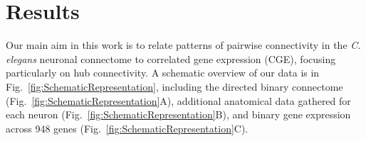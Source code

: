 \documentclass[10pt,letterpaper]{article}
\begin{document}




\section*{Results}
Our main aim in this work is to relate patterns of pairwise connectivity in the \emph{C. elegans} neuronal connectome to correlated gene expression (CGE), focusing particularly on hub connectivity.
A schematic overview of our data is in Fig.~\ref{fig:SchematicRepresentation}, including
the directed binary connectome (Fig.~\ref{fig:SchematicRepresentation}A),
additional anatomical data gathered for each neuron (Fig.~\ref{fig:SchematicRepresentation}B),
and binary gene expression across 948 genes (Fig.~\ref{fig:SchematicRepresentation}C).
\end{document}
